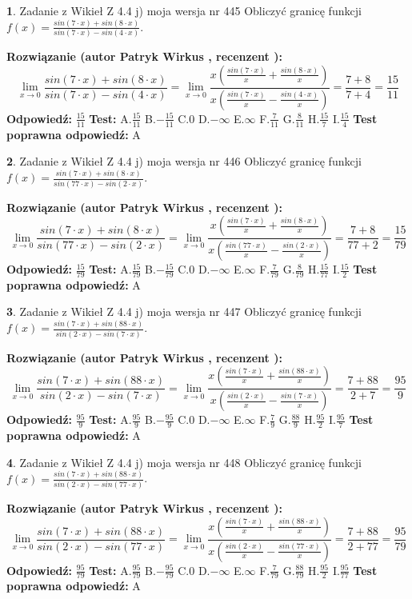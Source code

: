 \documentclass[12pt, a4paper]{article}
\theoremstyle{definition} %
\newtheorem{zad}{}
\newcommand{\zadStart}[1]{\begin{zad}#1\newline}
\newcommand{\zadStop}{\end{zad}}
\newcommand{\rozwStart}[2]{\noindent \textbf{Rozwiązanie (autor #1 , recenzent #2): }\newline}
\newcommand{\rozwStop}{\newline}
\newcommand{\odpStart}{\noindent \textbf{Odpowiedź:}\newline}
\newcommand{\odpStop}{\newline}
\newcommand{\testStart}{\noindent \textbf{Test:}\newline}
\newcommand{\testStop}{\newline}
\newcommand{\kluczStart}{\noindent \textbf{Test poprawna odpowiedź:}\newline}
\newcommand{\kluczStop}{\newline}
\begin{document}
\zadStart{Zadanie z Wikieł Z 4.4 j) moja wersja nr 445}
Obliczyć granicę funkcji $f(x)=\frac{sin(7\cdot x) +sin(8\cdot x)}{sin(7\cdot x) -sin(4\cdot x)}$.
\zadStop
\rozwStart{Patryk Wirkus}{}
$$\lim\limits_{x\to 0}\frac{sin(7\cdot x) +sin(8\cdot x)}{sin(7\cdot x) -sin(4\cdot x)}=\lim\limits_{x\to 0}\frac{x(\frac{sin(7\cdot x)}{x}+\frac{sin(8\cdot x)}{x})}{x(\frac{sin(7\cdot x)}{x}-\frac{sin(4\cdot x)}{x})}=\frac{7+8}{7+4} = \frac{15}{11}$$
\rozwStop
\odpStart
$\frac{15}{11}$
\odpStop
\testStart
A.$\frac{15}{11}$
B.$-\frac{15}{11}$
C.$0$
D.$-\infty$
E.$\infty$
F.$\frac{7}{11}$
G.$\frac{8}{11}$
H.$\frac{15}{7}$
I.$\frac{15}{4}$
\testStop
\kluczStart
A
\kluczStop



\zadStart{Zadanie z Wikieł Z 4.4 j) moja wersja nr 446}
Obliczyć granicę funkcji $f(x)=\frac{sin(7\cdot x) +sin(8\cdot x)}{sin(77\cdot x) -sin(2\cdot x)}$.
\zadStop
\rozwStart{Patryk Wirkus}{}
$$\lim\limits_{x\to 0}\frac{sin(7\cdot x) +sin(8\cdot x)}{sin(77\cdot x) -sin(2\cdot x)}=\lim\limits_{x\to 0}\frac{x(\frac{sin(7\cdot x)}{x}+\frac{sin(8\cdot x)}{x})}{x(\frac{sin(77\cdot x)}{x}-\frac{sin(2\cdot x)}{x})}=\frac{7+8}{77+2} = \frac{15}{79}$$
\rozwStop
\odpStart
$\frac{15}{79}$
\odpStop
\testStart
A.$\frac{15}{79}$
B.$-\frac{15}{79}$
C.$0$
D.$-\infty$
E.$\infty$
F.$\frac{7}{79}$
G.$\frac{8}{79}$
H.$\frac{15}{77}$
I.$\frac{15}{2}$
\testStop
\kluczStart
A
\kluczStop



\zadStart{Zadanie z Wikieł Z 4.4 j) moja wersja nr 447}
Obliczyć granicę funkcji $f(x)=\frac{sin(7\cdot x) +sin(88\cdot x)}{sin(2\cdot x) -sin(7\cdot x)}$.
\zadStop
\rozwStart{Patryk Wirkus}{}
$$\lim\limits_{x\to 0}\frac{sin(7\cdot x) +sin(88\cdot x)}{sin(2\cdot x) -sin(7\cdot x)}=\lim\limits_{x\to 0}\frac{x(\frac{sin(7\cdot x)}{x}+\frac{sin(88\cdot x)}{x})}{x(\frac{sin(2\cdot x)}{x}-\frac{sin(7\cdot x)}{x})}=\frac{7+88}{2+7} = \frac{95}{9}$$
\rozwStop
\odpStart
$\frac{95}{9}$
\odpStop
\testStart
A.$\frac{95}{9}$
B.$-\frac{95}{9}$
C.$0$
D.$-\infty$
E.$\infty$
F.$\frac{7}{9}$
G.$\frac{88}{9}$
H.$\frac{95}{2}$
I.$\frac{95}{7}$
\testStop
\kluczStart
A
\kluczStop



\zadStart{Zadanie z Wikieł Z 4.4 j) moja wersja nr 448}
Obliczyć granicę funkcji $f(x)=\frac{sin(7\cdot x) +sin(88\cdot x)}{sin(2\cdot x) -sin(77\cdot x)}$.
\zadStop
\rozwStart{Patryk Wirkus}{}
$$\lim\limits_{x\to 0}\frac{sin(7\cdot x) +sin(88\cdot x)}{sin(2\cdot x) -sin(77\cdot x)}=\lim\limits_{x\to 0}\frac{x(\frac{sin(7\cdot x)}{x}+\frac{sin(88\cdot x)}{x})}{x(\frac{sin(2\cdot x)}{x}-\frac{sin(77\cdot x)}{x})}=\frac{7+88}{2+77} = \frac{95}{79}$$
\rozwStop
\odpStart
$\frac{95}{79}$
\odpStop
\testStart
A.$\frac{95}{79}$
B.$-\frac{95}{79}$
C.$0$
D.$-\infty$
E.$\infty$
F.$\frac{7}{79}$
G.$\frac{88}{79}$
H.$\frac{95}{2}$
I.$\frac{95}{77}$
\testStop
\kluczStart
A
\kluczStop
\end{document}
